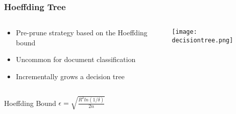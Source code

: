 \begin{frame}
	\frametitle{Hoeffding Tree}
	\begin{columns}
		\begin{column}{0.5\textwidth}
			\begin{itemize}
				\item Pre-prune strategy based on the Hoeffding bound
				\item Uncommon for document classification
				\item Incrementally grows a decision tree
			\end{itemize}
		\end{column}
		\begin{column}{0.5\textwidth}  %
			\texttt{[image: decisiontree.png]}
		\end{column}
	\end{columns}
	\begin{block}{Hoeffding Bound}
		\centering
		$\epsilon = \sqrt{\frac{R^2ln(1/\delta)}{2n}}$
	\end{block}
\end{frame}